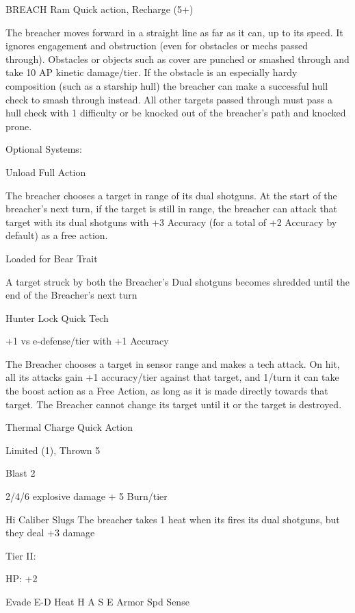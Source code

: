 BREACH Ram  
Quick action, Recharge (5+)
 
The breacher moves forward in a straight line as far as it can, up to its speed. It ignores  
engagement and obstruction (even for obstacles or mechs passed through). Obstacles or  
objects such as cover are punched or smashed through and take 10 AP kinetic damage/tier. If  
the obstacle is an especially hardy composition (such as a starship hull) the breacher can make a  
successful hull check to smash through instead. All other targets passed through must pass a  
hull check with 1 difficulty or be knocked out of the breacher’s path and knocked prone.
 

Optional Systems:
 
Unload  
Full Action
 
The breacher chooses a target in range of its dual shotguns. At the start of the breacher’s next  
turn, if the target is still in range, the breacher can attack that target with its dual shotguns with  
+3 Accuracy (for a total of +2 Accuracy by default) as a free action.
 

Loaded for Bear  
Trait
 

                                                                                                          


A target struck by both the Breacher’s Dual shotguns becomes shredded until the end of the  
Breacher’s next turn
 

Hunter Lock  
Quick Tech
 
+1 vs e-defense/tier with +1 Accuracy
 
The Breacher chooses a target in sensor range and makes a tech attack. On hit, all its attacks  
gain +1 accuracy/tier against that target, and 1/turn it can take the boost action as a Free Action,  
as long as it is made directly towards that target. The Breacher cannot change its target until it or  
the target is destroyed.
 

Thermal Charge  
Quick Action
 
Limited (1), Thrown 5
 
Blast 2
 
2/4/6 explosive damage + 5 Burn/tier
 

Hi Caliber Slugs  
The breacher takes 1 heat when its fires its dual shotguns, but they deal +3 damage
 

Tier II:
 
HP: +2
 

          Evade     E-D    Heat    H    A     S     E       Armor        Spd       Sense 

